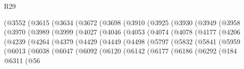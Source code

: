\begin{lexlean}{R29}
\begin{coremodule}
                (@3552
                  (@3615
                    (@3634
                      (@3672
                        (@3698
                          (@3910
                            (@3925
                              (@3930
                                (@3949
                                  (@3958
                                    (@3970
                                      (@3989
                                        (@3999
                                          (@4027
                                            (@4046
                                              (@4053
                                                (@4074
                                                  (@4078
                                                    (@4177
                                                      (@4206
                                                        (@4239
                                                          (@4264
                                                            (@4379
                                                              (@4429
                                                                (@4449
                                                                  (@4498
                                                                    (@5797
                                                                      (@5832
                                                                        (@5841
                                                                          (@5959
                                                                            (@6013
                                                                              (@6038
                                                                                (@6047
                                                                                  (@6092
                                                                                    (@6120
                                                                                      (@6142
                                                                                        (@6177
                                                                                          (@6186
                                                                                            (@6292
                                                                                              (@184
                                                                                                @6311
                                                                                                (@56

\end{coremodule}
\end{lexlean}
